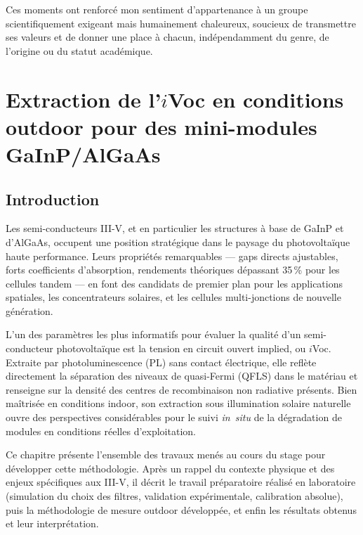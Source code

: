 \documentclass[12pt,a4paper]{report}
\begin{document}
Ces moments ont renforcé mon sentiment d'appartenance à un groupe scientifiquement exigeant mais humainement chaleureux, soucieux de transmettre ses valeurs et de donner une place à chacun, indépendamment du genre, de l'origine ou du statut académique.

\chapter{Extraction de l'$i$Voc en conditions outdoor pour des mini-modules GaInP/AlGaAs}

\section*{Introduction}

Les semi-conducteurs III-V, et en particulier les structures à base de GaInP et d'AlGaAs, occupent une position stratégique dans le paysage du photovoltaïque haute performance. Leurs propriétés remarquables --- gaps directs ajustables, forts coefficients d'absorption, rendements théoriques dépassant 35\,\% pour les cellules tandem --- en font des candidats de premier plan pour les applications spatiales, les concentrateurs solaires, et les cellules multi-jonctions de nouvelle génération.

L'un des paramètres les plus informatifs pour évaluer la qualité d'un semi-conducteur photovoltaïque est la tension en circuit ouvert implied, ou $i$Voc. Extraite par photoluminescence (PL) sans contact électrique, elle reflète directement la séparation des niveaux de quasi-Fermi (QFLS) dans le matériau et renseigne sur la densité des centres de recombinaison non radiative présents. Bien maîtrisée en conditions indoor, son extraction sous illumination solaire naturelle ouvre des perspectives considérables pour le suivi \textit{in~situ} de la dégradation de modules en conditions réelles d'exploitation.

Ce chapitre présente l'ensemble des travaux menés au cours du stage pour développer cette méthodologie. Après un rappel du contexte physique et des enjeux spécifiques aux III-V, il décrit le travail préparatoire réalisé en laboratoire (simulation du choix des filtres, validation expérimentale, calibration absolue), puis la méthodologie de mesure outdoor développée, et enfin les résultats obtenus et leur interprétation.
\end{document}

